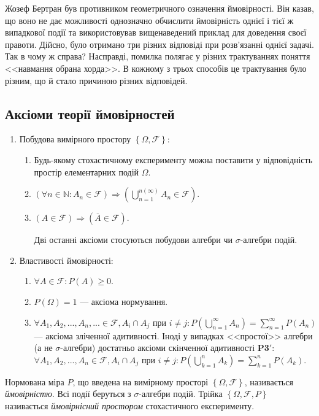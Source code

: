 \begin{example}
    Жозеф Бертран був противником геометричного означення ймовірності.
    Він казав, що воно не дає можливості однозначно обчислити ймовірність
    однієї і тієї ж випадкової події та використовував вищенаведений приклад
    для доведення своєї правоти. Дійсно, було отримано три різних відповіді при
    розв'язанні однієї задачі. Так в чому ж справа? Насправді, помилка полягає
    у різних трактуваннях поняття <<навмання обрана хорда>>.
    В кожному з трьох способів це трактування було різним, що й стало причиною різних відповідей.
\end{example}

\subsection{Аксіоми теорії ймовірностей}
\begin{enumerate}[label=\Roman*.]
    \item Побудова вимірного простору $\left\{ \Omega, \mathcal{F}\right\}$:
    \begin{enumerate}[label = \textbf{A\arabic*:}]
        \item Будь-якому стохастичному експерименту можна поставити у відповідність
        простір елементарних подій $\Omega$.
        \item $\left(\forall n \in \mathbb{N}: A_n \in \mathcal{F} \right) \Rightarrow \left( \bigcup\limits_{n=1}^{n (\infty)} A_n \in \mathcal{F}\right)$.
        \item $\left( A \in \mathcal{F}\right) \Rightarrow \left( \overline{A} \in \mathcal{F}\right)$.
        
        Дві останні аксіоми стосуються побудови алгебри чи $\sigma$-алгебри подій.
    \end{enumerate}
    \item Властивості ймовірності:
    \begin{enumerate}[label = \textbf{P\arabic*:}]
        \item $\forall A \in \mathcal{F}: P(A)\geq 0$.
        \item $P(\Omega) = 1$ --- аксіома нормування.
        \item $\forall A_1, A_2, ..., A_n, ... \in \mathcal{F},  A_i \cap A_j \text{ при } i \neq j: P\left(\bigcup\limits_{n=1}^{\infty} A_n\right) = \sum\limits_{n=1}^{\infty} P(A_n)$ ---
        аксіома зліченної адитивності.
        Іноді у випадках <<простої>> алгебри (а не $\sigma$-алгебри) достатньо
        аксіоми скінченної адитивності \textbf{P3$'$}: 
        $\forall A_1, A_2, ..., A_n \in \mathcal{F},  A_i \cap A_j \text{ при } i \neq j: P\left(\bigcup\limits_{k=1}^{n} A_k\right) = \sum\limits_{k=1}^{n} P(A_k)$.
    \end{enumerate}
\end{enumerate}
\begin{definition}
    Нормована міра $P$, що введена на вимірному просторі $\left\{ \Omega, \mathcal{F}\right\}$,
    називається \emph{ймовірністю}. Всі події беруться з $\sigma$-алгебри подій.
    Трійка $\left\{ \Omega, \mathcal{F}, P\right\}$ називається 
    \emph{ймовірнісний простором} стохастичного експерименту.
\end{definition}

